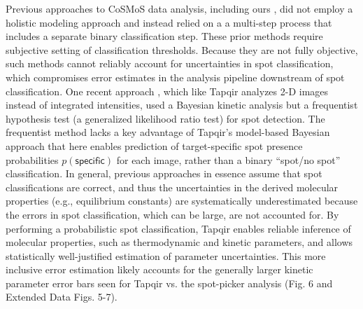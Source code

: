 Previous approaches to CoSMoS data analysis, including ours \cite{Friedman2015-nx}, did not employ a holistic modeling approach and instead relied on a a multi-step process that includes a separate binary classification step.  These prior methods require subjective setting of classification thresholds.  Because they are not fully objective, such methods cannot reliably account for uncertainties in spot classification, which compromises error estimates in the analysis pipeline downstream of spot classification. One recent approach \cite{Smith2019-yb,Smith2015-gf}, which like Tapqir analyzes 2-D images instead of integrated intensities, used a Bayesian kinetic analysis but a frequentist hypothesis test (a generalized likelihood ratio test) for spot detection.  The frequentist method lacks a key advantage of Tapqir's model-based Bayesian approach that here enables prediction of target-specific spot presence probabilities $p(\mathsf{specific})$ for each image, rather than a binary ``spot/no spot'' classification.  In general, previous approaches in essence assume that spot classifications are correct, and thus the uncertainties in the derived molecular properties (e.g., equilibrium constants) are systematically underestimated because the errors in spot classification, which can be large, are not accounted for. By performing a probabilistic spot classification, Tapqir enables reliable inference of molecular properties, such as thermodynamic and kinetic parameters, and allows statistically  well-justified estimation of parameter uncertainties.  This more inclusive error estimation likely accounts for the generally larger kinetic parameter error bars seen for Tapqir vs. the spot-picker analysis (Fig. 6 and Extended Data Figs. 5-7).


